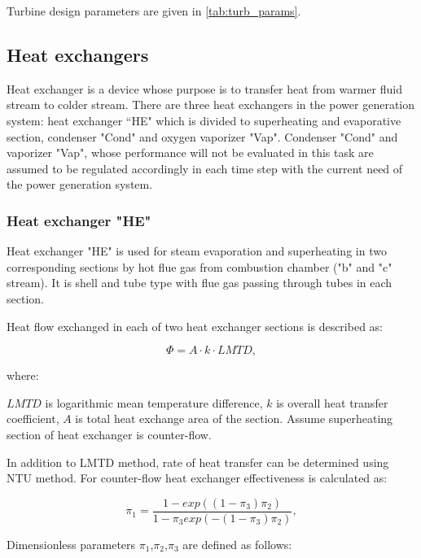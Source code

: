 \documentclass{article}
\begin{document}
	Turbine design parameters are given in \ref{tab:turb_params}.
	
	\subsection{Heat exchangers}
	
	Heat exchanger is a device whose purpose is to transfer heat from warmer fluid stream to colder stream. There are three heat exchangers in the power generation system: heat exchanger “HE" which is divided to superheating and evaporative section, condenser "Cond" and oxygen vaporizer "Vap". Condenser "Cond" and vaporizer "Vap", whose performance will not be evaluated in this task are assumed to be regulated accordingly in each time step with the current need of the power generation system. 
	
	\subsubsection*{Heat exchanger "HE"}
	
	Heat exchanger "HE" is used for steam evaporation and superheating in two corresponding sections by hot flue gas from combustion chamber ("b" and "c" stream). It is shell and tube type with flue gas passing through tubes in each section. 
	
	Heat flow exchanged in each of two heat exchanger sections is described as:
	
	\begin{equation}\label{eq:heat_flow}
		\Phi = A \cdot k \cdot LMTD,
	\end{equation}
	
	where:
	
	\noindent
	$LMTD$ is logarithmic mean temperature difference, 
	$k$ is overall heat transfer coefficient,
	$A$ is total heat exchange area of the section. 
	Assume superheating section of heat exchanger is counter-flow.
	
	In addition to LMTD method, rate of heat transfer can be determined using NTU method. For counter-flow heat exchanger effectiveness is calculated as:
	
	\begin{equation}\label{eq:heat_exchanger_eff}
		\pi_1 = \frac{1 - exp((1-\pi_3)\pi_2)}{1-\pi_3exp(-(1-\pi_3)\pi_2)},
	\end{equation}
	
	Dimensionless parameters $\pi_1$,$\pi_2$,$\pi_3$ are defined as follows:
	
\end{document}
